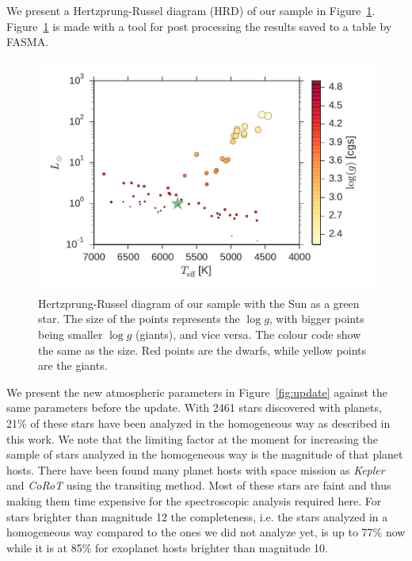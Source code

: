 \documentclass{aa}
\begin{document}
We present a Hertzprung-Russel diagram (HRD) of our sample in
Figure~\ref{fig:HRD}. Figure~\ref{fig:HRD} is made with a tool for post
processing the results saved to a table by FASMA.

\begin{figure}[tpb]
    \centering
    \includegraphics[width=1.0\linewidth,natwidth=440,natheight=290]{figures/HR.pdf}
    \caption{Hertzprung-Russel diagram of our sample with the Sun as a green
    star. The size of the points represents the $\log g$, with bigger points
    being smaller $\log g$ (giants), and vice versa. The colour code show the
    same as the size. Red points are the dwarfs, while yellow points are the
    giants.}
    \label{fig:HRD}
\end{figure}

We present the new atmospheric parameters in Figure~\ref{fig:update} against the
same parameters before the update. With 2461 stars discovered with planets, 21\%
of these stars have been analyzed in the homogeneous way as described in this
work. We note that the limiting factor at the moment for increasing the sample
of stars analyzed in the homogeneous way is the magnitude of that planet hosts.
There have been found many planet hosts with space mission as \emph{Kepler} and
\emph{CoRoT} using the transiting method. Most of these stars are faint and thus
making them time expensive for the spectroscopic analysis required here. For
stars brighter than magnitude 12 the completeness, i.e. the stars analyzed in a
homogeneous way compared to the ones we did not analyze yet, is up to 77\% now
while it is at 85\% for exoplanet hosts brighter than magnitude 10.
\end{document}
